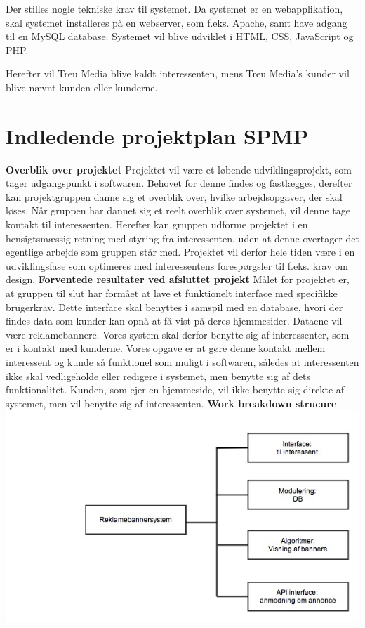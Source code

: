 \documentclass[a4paper,12pt]{article}
\begin{document}
Der stilles nogle tekniske krav til systemet. Da systemet er en webapplikation, skal systemet installeres på en webserver, som f.eks. Apache, samt have adgang til en MySQL database. Systemet vil blive udviklet i HTML, CSS, JavaScript og PHP.

Herefter vil Treu Media blive kaldt interessenten, mens Treu Media's kunder vil blive nævnt kunden eller kunderne.

\section{Indledende projektplan SPMP}

\textbf{Overblik over projektet}
\newline
Projektet vil være et løbende udviklingsprojekt, som tager udgangspunkt i softwaren. Behovet for denne findes og fastlægges, derefter kan projektgruppen danne sig et overblik over, hvilke arbejdsopgaver, der skal løses. Når gruppen har dannet sig et reelt overblik over systemet, vil denne tage kontakt til interessenten. Herefter kan gruppen udforme projektet i en hensigtsmæssig retning med styring fra interessenten, uden at denne overtager det egentlige arbejde som gruppen står med. Projektet vil derfor hele tiden være i en udviklingsfase som optimeres med interessentens forespørgsler til f.eks. krav om design.
\newline
\newline
\textbf{Forventede resultater ved afsluttet projekt}
\newline
Målet for projektet er, at gruppen til slut har formået at lave et funktionelt interface med specifikke brugerkrav. Dette interface skal benyttes i samspil med en database, hvori der findes data som kunder kan opnå at få vist på deres hjemmesider. Dataene vil være reklamebannere. Vores system skal derfor benytte sig af interessenter, som er i kontakt med kunderne. 
Vores opgave er at gøre denne kontakt mellem interessent og kunde så funktionel som muligt i softwaren, således at interessenten ikke skal vedligeholde eller redigere i systemet, men benytte sig af dets funktionalitet. Kunden, som ejer en hjemmeside, vil ikke benytte sig direkte af systemet, men vil benytte sig af interessenten.
\newline
\newline
\textbf{Work breakdown strucure}
\newline
\includegraphics[width=\textwidth,height=\textheight,keepaspectratio] {WorkBreakdownStructure.jpg}
\end{document}
